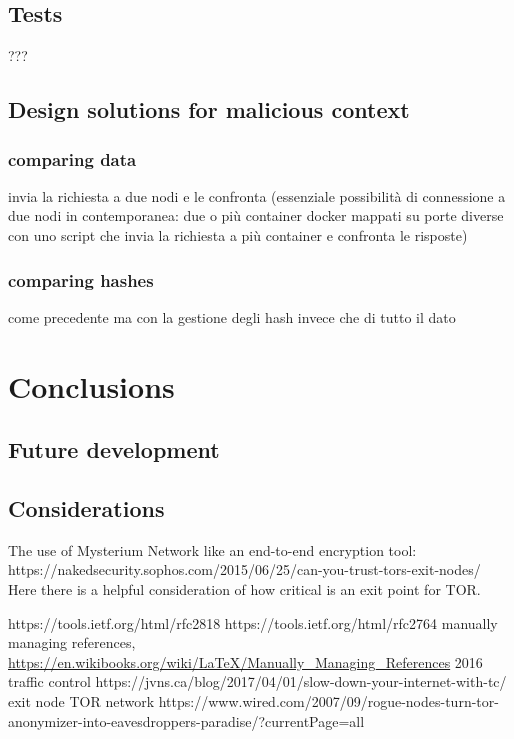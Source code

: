 \documentclass[12pt]{article}
\begin{document}
	\subsection{Tests}
		???
	\subsection{Design solutions for malicious context}
		\subsubsection{comparing data}
		invia la richiesta a due nodi e le confronta (essenziale possibilità di connessione a due nodi in contemporanea: due o più container docker mappati su porte diverse con uno script che invia la richiesta a più container e confronta le risposte)

		\subsubsection{comparing hashes}
		come precedente ma con la gestione degli hash invece che di tutto il dato
		
\section{Conclusions}
	\subsection{Future development}
	\subsection{Considerations}

	The use of Mysterium Network like an end-to-end encryption tool: https://nakedsecurity.sophos.com/2015/06/25/can-you-trust-tors-exit-nodes/
	Here there is a helpful consideration of how critical is an exit point for TOR.

	\pagebreak

	
	\begin{thebibliography}{1}
			https://tools.ietf.org/html/rfc2818
			https://tools.ietf.org/html/rfc2764
			manually managing references, 
			\url{https://en.wikibooks.org/wiki/LaTeX/Manually_Managing_References}
			2016
			traffic control
			https://jvns.ca/blog/2017/04/01/slow-down-your-internet-with-tc/
			exit node TOR network
			https://www.wired.com/2007/09/rogue-nodes-turn-tor-anonymizer-into-eavesdroppers-paradise/?currentPage=all

	\end{thebibliography}
		
	\pagebreak
	
	
\end{document}
